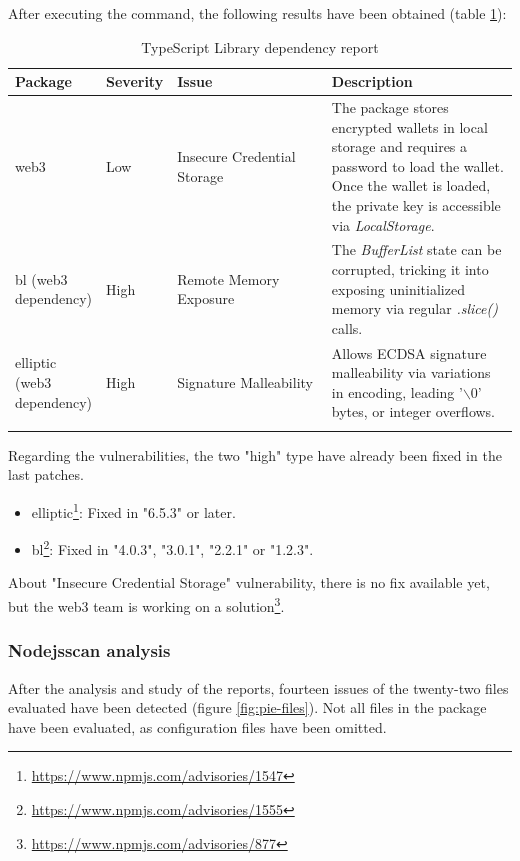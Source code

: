 After executing the command, the following results have been obtained (table \ref{tab:depen}):
\newpage
\begin{longtable}{||p{0.11\linewidth} | p{0.11\linewidth} | p{0.35\linewidth} | p{0.43\linewidth}||}
    \hline
    \textbf{Package}           & \textbf{Severity} & \textbf{Issue}              & \textbf{Description}                                                                                                                                                                  \\ [0.5ex]
    \hline\hline
    web3                       & Low               & Insecure Credential Storage & The package stores encrypted wallets in local storage and requires a password to load the wallet. Once the wallet is loaded, the private key is accessible via \textit{LocalStorage}. \\
    \hline
    bl (web3 dependency)       & High              & Remote Memory Exposure      & The \textit{BufferList} state can be corrupted, tricking it into exposing uninitialized memory via regular \textit{.slice()} calls.                                                   \\
    \hline
    elliptic (web3 dependency) & High              & Signature Malleability      & Allows ECDSA signature malleability via variations in encoding, leading '$\backslash$0' bytes, or integer overflows.                                                                  \\
    \hline
    \caption{TypeScript Library dependency report}
    \label{tab:depen}
\end{longtable}

Regarding the vulnerabilities, the two "high" type have already been fixed in the last patches.
\begin{itemize}
    \item elliptic\footnote{\url{https://www.npmjs.com/advisories/1547}}: Fixed in "6.5.3" or later.
    \item bl\footnote{\url{https://www.npmjs.com/advisories/1555}}: Fixed in "4.0.3", "3.0.1", "2.2.1" or "1.2.3".
\end{itemize}

About "Insecure Credential Storage" vulnerability, there is no fix available yet, but the web3 team is working on a solution\footnote{\url{https://www.npmjs.com/advisories/877}}.

\subsubsection{Nodejsscan analysis}
After the analysis and study of the reports, fourteen issues of the twenty-two files evaluated have been detected (figure \ref{fig:pie-files}). Not all files in the package have been evaluated, as configuration files have been omitted.\\

